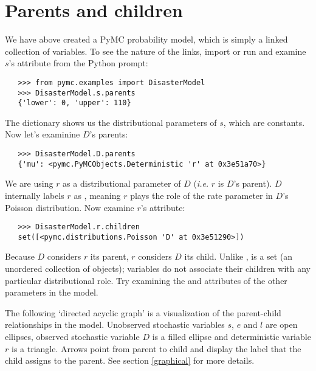 \section{Parents and children}

We have above created a PyMC probability model, which is simply a linked collection of variables. To see the nature of the links, import or run  and examine $s$'s  attribute from the Python prompt:
\begin{verbatim}
   >>> from pymc.examples import DisasterModel
   >>> DisasterModel.s.parents
   {'lower': 0, 'upper': 110}
\end{verbatim}
The  dictionary shows us the distributional parameters of $s$, which are constants. Now let's examinine $D$'s parents:
\begin{verbatim}
   >>> DisasterModel.D.parents
   {'mu': <pymc.PyMCObjects.Deterministic 'r' at 0x3e51a70>}
\end{verbatim}
We are using $r$ as a distributional parameter of $D$ (\emph{i.e.} $r$ is $D$'s parent). $D$ internally labels $r$ as , meaning $r$ plays the role of the rate parameter in $D$'s Poisson distribution. Now examine $r$'s  attribute:
\begin{verbatim}
   >>> DisasterModel.r.children
   set([<pymc.distributions.Poisson 'D' at 0x3e51290>])
\end{verbatim}
Because $D$ considers $r$ its parent, $r$ considers $D$ its child. Unlike ,  is a set (an unordered collection of objects); variables do not associate their children with any particular distributional role. Try examining the  and  attributes of the other parameters in the model.

The following `directed acyclic graph' is a visualization of the parent-child relationships in the model. Unobserved stochastic variables $s$, $e$ and $l$ are open ellipses, observed stochastic variable $D$ is a filled ellipse and deterministic variable $r$ is a triangle. Arrows point from parent to child and display the label that the child assigns to the parent. See section \ref{graphical} for more details.
\begin{center}
\end{center}


